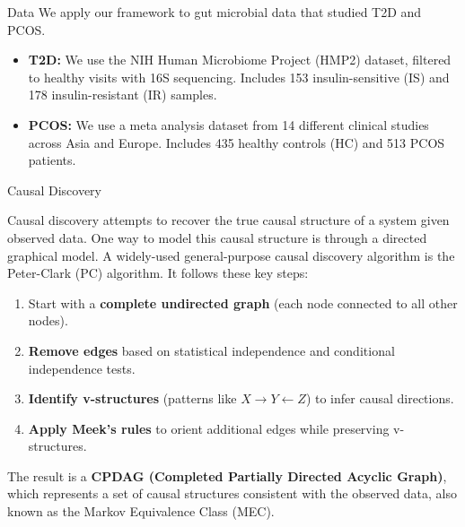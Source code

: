 \documentclass[final]{beamer}
\newlength{\colwidth}
\begin{document}
\begin{frame}[t]
\begin{columns}[t]
\begin{column}{\colwidth}
\begin{block}{Data}
    We apply our framework to gut microbial data that studied T2D and PCOS. 
    
    \begin{itemize}
      \item \textbf{T2D:} We use the NIH Human Microbiome Project (HMP2) dataset, filtered to healthy visits with 16S sequencing. Includes 153 insulin-sensitive (IS) and 178 insulin-resistant (IR) samples.
      \item \textbf{PCOS:} We use a meta analysis dataset from 14 different clinical studies across Asia and Europe. Includes 435 healthy controls (HC) and 513 PCOS patients.
    \end{itemize}

  \end{block}
  
	  \begin{alertblock}{Causal Discovery}
	  
	  	Causal discovery attempts to recover the true causal structure of a system given observed data. One way to model this causal structure is through a directed graphical model. A widely-used general-purpose causal discovery algorithm is the Peter-Clark (PC) algorithm. It follows these key steps:
		\begin{enumerate}
		    \item Start with a \textbf{complete undirected graph} (each node connected to all other nodes).
		    \item \textbf{Remove edges} based on statistical independence and conditional independence tests.
		    \item \textbf{Identify v-structures} (patterns like $X \to Y \leftarrow Z$) to infer causal directions.
		    \item \textbf{Apply Meek’s rules} to orient additional edges while preserving v-structures.
		\end{enumerate}

	The result is a \textbf{CPDAG (Completed Partially Directed Acyclic Graph)}, which represents a set of causal structures consistent with the observed data, also known as the Markov Equivalence Class (MEC). 

	  

\end{alertblock}
\end{column}
\end{columns}
\end{frame}
\end{document}
